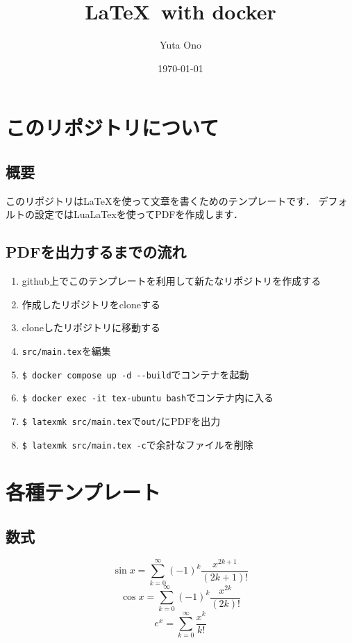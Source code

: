 \documentclass[
    luatex,
    unicode,
    titlepage,
    pdfusetitle
]{ltjsarticle}
\begin{document}
\title{\LaTeX \ with docker}
\author{Yuta Ono}
\date{\today}
\maketitle

\section{このリポジトリについて}
\subsection{概要}
このリポジトリは\LaTeX を使って文章を書くためのテンプレートです．
デフォルトの設定ではLuaLaTexを使ってPDFを作成します．

\subsection{PDFを出力するまでの流れ}
\begin{enumerate}
	\item github上でこのテンプレートを利用して新たなリポジトリを作成する
	\item 作成したリポジトリをcloneする
	\item cloneしたリポジトリに移動する
	\item \verb|src/main.tex|を編集
	\item \verb|$ docker compose up -d --build|でコンテナを起動
	\item \verb|$ docker exec -it tex-ubuntu bash|でコンテナ内に入る
	\item \verb|$ latexmk src/main.tex|で\verb|out/|にPDFを出力
	\item \verb|$ latexmk src/main.tex -c|で余計なファイルを削除
\end{enumerate}

\newpage

\section{各種テンプレート}
\subsection{数式}
\begin{equation}
	\sin x = \sum^{\infty}_{k=0} (-1)^k \frac{x^{2k+1}}{(2k+1)!}  \label{eq:sin}
\end{equation}
\begin{equation}
	\cos x = \sum^{\infty}_{k=0} (-1)^k \frac{x^{2k}}{(2k)!}  \label{eq:cos}
\end{equation}
\begin{equation}
	e^x = \sum^{\infty}_{k=0} \frac{x^k}{k!}  \label{eq:exp}
\end{equation}
\end{document}
